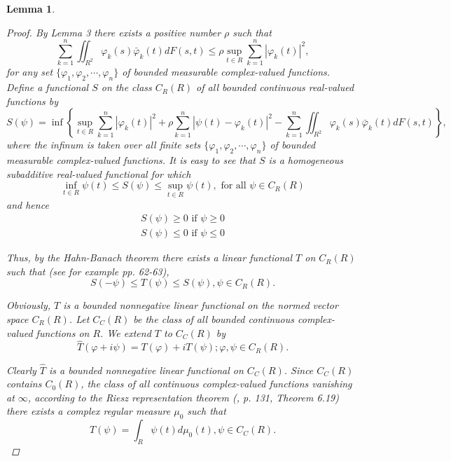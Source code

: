 \documentclass{article}
\newtheorem{lemma}[theorem]{Lemma}
\begin{document}
\begin{lemma}
\begin{enumerate}
\begin{proof}
By Lemma 3 there exists a positive number $\rho$ such that
\begin{equation}
\sum_{k=1}^{n} \iint_{R^{2}} \varphi_{k}(s) \bar{\varphi}_{k}(t) d F(s, t) \leq \rho \sup_{t \in R} \sum_{k=1}^{n} |\varphi_k(t)|^2,
\end{equation}
for any set $\{\varphi_1, \varphi_2, \cdots, \varphi_n\}$ of bounded measurable complex-valued functions. Define a functional $S$ on the class $C_R(R)$ of all bounded continuous real-valued functions by
\begin{equation}
S(\psi) = \inf \left\{ \sup_{t \in R} \sum_{k=1}^{n} |\varphi_k(t)|^2 + \rho \sum_{k=1}^{n} |\psi(t) - \varphi_k(t)|^2 - \sum_{k=1}^{n} \iint_{R^{2}} \varphi_{k}(s) \bar{\varphi}_{k}(t) d F(s, t) \right\},
\end{equation}
where the infinum is taken over all finite sets $\{\varphi_1, \varphi_2, \cdots, \varphi_n\}$ of bounded measurable complex-valued functions. It is easy to see that $S$ is a homogeneous subadditive real-valued functional for which
\begin{equation}
\inf_{t \in R} \psi(t) \leq S(\psi) \leq \sup_{t \in R} \psi(t), \text{ for all } \psi \in C_R(R)
\end{equation}
and hence
\begin{align}
S(\psi) \geq 0 \text{ if } \psi \geq 0 \\
S(\psi) \leq 0 \text{ if } \psi \leq 0
\end{align}

Thus, by the Hahn-Banach theorem there exists a linear functional $T$ on $C_R(R)$ such that (see for example \cite{dunford} pp. 62-63),
\begin{equation}
S(-\psi) \leq T(\psi) \leq S(\psi), \psi \in C_R(R).
\end{equation}

Obviously, $T$ is a bounded nonnegative linear functional on the normed vector space $C_R(R)$. Let $C_C(R)$ be the class of all bounded continuous complex-valued functions on $R$. We extend $T$ to $C_C(R)$ by
\begin{equation}
\hat{T}(\varphi + i\psi) = T(\varphi) + iT(\psi); \varphi, \psi \in C_R(R).
\end{equation}

Clearly $\hat{T}$ is a bounded nonnegative linear functional on $C_C(R)$. Since $C_C(R)$ contains $C_0(R)$, the class of all continuous complex-valued functions vanishing at $\infty$, according to the Riesz representation theorem (\cite{rudin}, p. 131, Theorem 6.19) there exists a complex regular measure $\mu_0$ such that
\begin{equation}
T(\psi) = \int_{R} \psi(t) d\mu_0(t), \psi \in C_C(R).
\end{equation}


\end{proof}
\end{enumerate}
\end{lemma}
\end{document}
